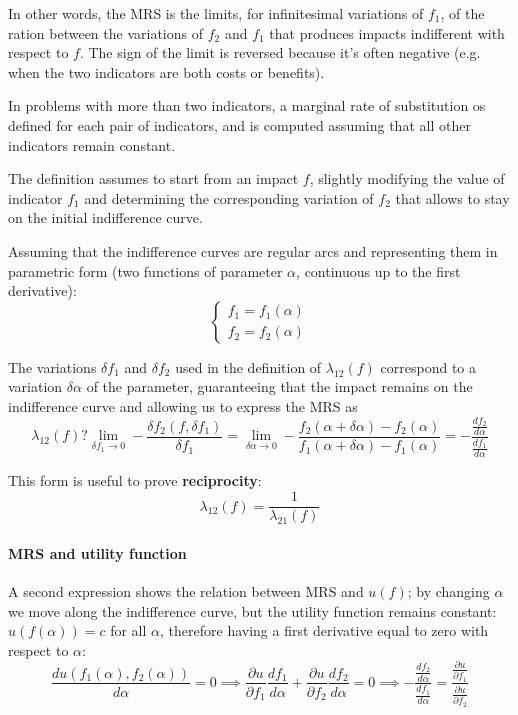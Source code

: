 In other words, the MRS is the limits, for infinitesimal variations of $f_1$, of the ration between the variations of $f_2$ and $f_1$ that produces impacts indifferent with respect to $f$. The sign of the limit is reversed because it's often negative (e.g. when the two indicators are both costs or benefits).

In problems with more than two indicators, a marginal rate of substitution os defined for each pair of indicators, and is computed assuming that all other indicators remain constant.

The definition assumes to start from an impact $f$, slightly modifying the value of indicator $f_1$ and determining the corresponding variation of $f_2$ that allows to stay on the initial indifference curve.

Assuming that the indifference curves are regular arcs and representing them in parametric form (two functions of parameter $\alpha$, continuous up to the first derivative): 
$$
\begin{cases}
	f_1 = f_1 (\alpha) \\ f_2 = f_2 (\alpha)
\end{cases}
$$

The variations $\delta f_1$ and $\delta f_2$ used in the definition of $\lambda_{12}(f)$ correspond to a variation $\delta \alpha$ of the parameter, guaranteeing that the impact remains on the indifference curve and allowing us to express the MRS as
$$ \lambda_{12} (f) ? \lim_{\delta f_1 \rightarrow 0} - \frac{\delta f_2 (f, \delta f_1)}{\delta f_1} = \lim_{\delta \alpha \rightarrow 0} - \frac{f_2 (\alpha + \delta \alpha) - f_2 (\alpha)}{f_1 (\alpha + \delta \alpha) - f_1 (\alpha)} = - \frac{\frac{df_2}{d\alpha}}{\frac{d f_1}{d \alpha}} $$

This form is useful to prove \textbf{reciprocity}:
$$ \lambda_{12} (f) = \frac{1}{\lambda_{21} (f)} $$

\paragraph{MRS and utility function} A second expression shows the relation between MRS and $u(f)$; by changing $\alpha$ we move along the indifference curve, but the utility function remains constant: $u(f(\alpha)) = c$ for all $\alpha$, therefore having a first derivative equal to zero with respect to $\alpha$:
$$ \frac{d u(f_1 (\alpha), f_2 (\alpha))}{d \alpha} = 0 \implies \frac{\partial u}{\partial f_1} \frac{d f_1}{d \alpha} + \frac{\partial u}{\partial f_2} \frac{d f_2}{d \alpha} = 0 \implies - \frac{\frac{df_2}{d\alpha}}{\frac{df_1}{d \alpha}} = \frac{\frac{\partial u}{\partial f_1}}{\frac{\partial u}{\partial f_2}} $$

